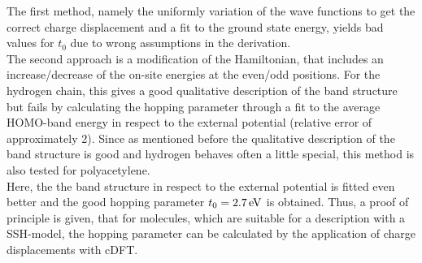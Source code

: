 The first method, namely the uniformly variation of the wave functions to get the correct charge displacement and a fit to the ground state energy, yields bad values for $t_0$ due to wrong assumptions in the derivation.\\
The second approach is a modification of the Hamiltonian, that includes an increase/decrease of the on-site energies at the even/odd positions. For the hydrogen chain, this gives a good qualitative description of the band structure but fails by calculating the hopping parameter through a fit to the average HOMO-band energy in respect to the external potential (relative error of approximately 2). Since as mentioned before the qualitative description of the band structure is good and hydrogen behaves often a little special, this method is also tested for polyacetylene.\\
Here, the the band structure in respect to the external potential is fitted even better and the good hopping parameter $t_0 = \unit[2.7]{eV}$ is obtained. Thus, a proof of principle is given, that for molecules, which are suitable for a description with a SSH-model, the hopping parameter can be calculated by the application of charge displacements with cDFT.